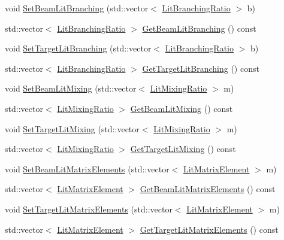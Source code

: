 \begin{DoxyCompactItemize}
\item 
void \hyperlink{classCoulExSimMinFCN_aa7c8b70cfc17e955422577b5ffa0a8f5}{Set\-Beam\-Lit\-Branching} (std\-::vector$<$ \hyperlink{classLitBranchingRatio}{Lit\-Branching\-Ratio} $>$ b)
\item 
std\-::vector$<$ \hyperlink{classLitBranchingRatio}{Lit\-Branching\-Ratio} $>$ \hyperlink{classCoulExSimMinFCN_a2822866831b72daa308d8b1c853e8274}{Get\-Beam\-Lit\-Branching} () const 
\item 
void \hyperlink{classCoulExSimMinFCN_a36fd7b603dcbefac4b15d29187930969}{Set\-Target\-Lit\-Branching} (std\-::vector$<$ \hyperlink{classLitBranchingRatio}{Lit\-Branching\-Ratio} $>$ b)
\item 
std\-::vector$<$ \hyperlink{classLitBranchingRatio}{Lit\-Branching\-Ratio} $>$ \hyperlink{classCoulExSimMinFCN_ad81ea12c8cfbbc9a2c59fe28e0a430bb}{Get\-Target\-Lit\-Branching} () const 
\item 
void \hyperlink{classCoulExSimMinFCN_a5fa7e2f84e13b26fab97e82b0015dd60}{Set\-Beam\-Lit\-Mixing} (std\-::vector$<$ \hyperlink{classLitMixingRatio}{Lit\-Mixing\-Ratio} $>$ m)
\item 
std\-::vector$<$ \hyperlink{classLitMixingRatio}{Lit\-Mixing\-Ratio} $>$ \hyperlink{classCoulExSimMinFCN_a04cbc0110cc3befed013eebd65fca59d}{Get\-Beam\-Lit\-Mixing} () const 
\item 
void \hyperlink{classCoulExSimMinFCN_a96a6f213caf7fa73ba04a51d654ed165}{Set\-Target\-Lit\-Mixing} (std\-::vector$<$ \hyperlink{classLitMixingRatio}{Lit\-Mixing\-Ratio} $>$ m)
\item 
std\-::vector$<$ \hyperlink{classLitMixingRatio}{Lit\-Mixing\-Ratio} $>$ \hyperlink{classCoulExSimMinFCN_ae9f2baf7684086906307827bc337874b}{Get\-Target\-Lit\-Mixing} () const 
\item 
void \hyperlink{classCoulExSimMinFCN_a371314dcefd70fe75f79223f39377df5}{Set\-Beam\-Lit\-Matrix\-Elements} (std\-::vector$<$ \hyperlink{classLitMatrixElement}{Lit\-Matrix\-Element} $>$ m)
\item 
std\-::vector$<$ \hyperlink{classLitMatrixElement}{Lit\-Matrix\-Element} $>$ \hyperlink{classCoulExSimMinFCN_ab837d701a370da3953a98d39f92a63a1}{Get\-Beam\-Lit\-Matrix\-Elements} () const 
\item 
void \hyperlink{classCoulExSimMinFCN_a4ae2477a151a7de4222f52a5c59f7c81}{Set\-Target\-Lit\-Matrix\-Elements} (std\-::vector$<$ \hyperlink{classLitMatrixElement}{Lit\-Matrix\-Element} $>$ m)
\item 
std\-::vector$<$ \hyperlink{classLitMatrixElement}{Lit\-Matrix\-Element} $>$ \hyperlink{classCoulExSimMinFCN_ad0c603d4dc267eeafa7d1a0410d9c977}{Get\-Target\-Lit\-Matrix\-Elements} () const 

\end{DoxyCompactItemize}
